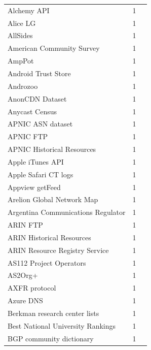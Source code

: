 \documentclass[11pt,a4paper]{article}
\begin{document}
\begin{longtable}{@{}p{} p{}p{}@{}}
Alchemy API & 1 & \cite{10.1145/3777912.3839782} \\
Alice LG & 1 & \cite{10.1007/978-3-031-56252-5_10} \\
AllSides & 1 & \cite{10.1145/3487552.3487850} \\
American Community Survey & 1 & \cite{10.1145/3517745.3561460} \\
AmpPot & 1 & \cite{10.1145/3646547.3688451} \\
Android Trust Store & 1 & \cite{10.1007/978-3-031-28486-1_4} \\
Androzoo & 1 & \cite{10.1145/3646547.3688405} \\
AnonCDN Dataset & 1 & \cite{10.1145/3646547.3688411} \\
Anycast Census & 1 & \cite{10.1007/978-3-031-56252-5_1} \\
APNIC ASN dataset & 1 & \cite{10.1145/3487552.3487854} \\
APNIC FTP & 1 & \cite{10.1145/3487552.3487838} \\
APNIC Historical Resources & 1 & \cite{10.1145/3487552.3487838} \\
Apple iTunes API & 1 & \cite{10.1145/3777912.3839789} \\
Apple Safari CT logs & 1 & \cite{10.1145/3618257.3624802} \\
Appview getFeed & 1 & \cite{10.1145/3646547.3688407} \\
Arelion Global Network Map & 1 & \cite{10.1145/3777912.3809135} \\
Argentina Communications Regulator & 1 & \cite{10.1007/978-3-032-18268-5_4} \\
ARIN FTP & 1 & \cite{10.1145/3487552.3487838} \\
ARIN Historical Resources & 1 & \cite{10.1145/3487552.3487838} \\
ARIN Resource Registry Service & 1 & \cite{10.1145/3730567.3764452} \\
AS112 Project Operators & 1 & \cite{10.1007/978-3-032-18268-5_9} \\
AS2Org+ & 1 & \cite{10.1145/3777912.3809155} \\
AXFR protocol & 1 & \cite{10.1145/3730567.3764501} \\
Azure DNS & 1 & \cite{10.1007/978-3-030-72582-2_14} \\
Berkman research center lists & 1 & \cite{10.1145/3618257.3624817} \\
Best National University Rankings & 1 & \cite{10.1007/978-3-030-72582-2_4} \\
BGP community dictionary & 1 & \cite{10.1145/3730567.3732924} \\

\end{longtable}
\end{document}
